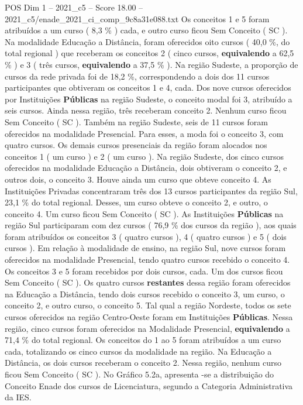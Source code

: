 \begin{textsample}{POS Dim 1 – 2021\_c5 – Score 18.00 – 2021\_c5/enade\_2021\_ci\_comp\_9c8a31e088.txt}
Os conceitos 1 e 5 foram atribuídos a um curso ( 8,3 \% ) cada, e outro curso ficou Sem Conceito ( SC ).
Na modalidade Educação a Distância, foram oferecidos oito cursos ( 40,0 \%, do total regional ) que receberam os conceitos 2 ( cinco cursos, \textbf{equivalendo} a 62,5 \% ) e 3 ( três cursos, \textbf{equivalendo} a 37,5 \% ).
Na região Sudeste, a proporção de cursos da rede privada foi de 18,2 \%, correspondendo a dois dos 11 cursos participantes que obtiveram os conceitos 1 e 4, cada.
Dos nove cursos oferecidos por Instituições \textbf{Públicas} na região Sudeste, o conceito modal foi 3, atribuído a seis cursos.
Ainda nessa região, três receberam conceito 2.
Nenhum curso ficou Sem Conceito ( SC ).
Também na região Sudeste, seis de 11 cursos foram oferecidos na modalidade Presencial.
Para esses, a moda foi o conceito 3, com quatro cursos.
Os demais cursos presenciais da região foram alocados nos conceitos 1 ( um curso ) e 2 ( um curso ).
Na região Sudeste, dos cinco cursos oferecidos na modalidade Educação a Distância, dois obtiveram o conceito 2, e outros dois, o conceito 3.
Houve ainda um curso que obteve conceito 4.
As Instituições Privadas concentraram três dos 13 cursos participantes da região Sul, 23,1 \% do total regional.
Desses, um curso obteve o conceito 2, e outro, o conceito 4.
Um curso ficou Sem Conceito ( SC ).
As Instituições \textbf{Públicas} na região Sul participaram com dez cursos ( 76,9 \% dos cursos da região ), aos quais foram atribuídos os conceitos 3 ( quatro cursos ), 4 ( quatro cursos ) e 5 ( dois cursos ).
Em relação à modalidade de ensino, na região Sul, nove cursos foram oferecidos na modalidade Presencial, tendo quatro cursos recebido o conceito 4.
Os conceitos 3 e 5 foram recebidos por dois cursos, cada.
Um dos cursos ficou Sem Conceito ( SC ).
Os quatro cursos \textbf{restantes} dessa região foram oferecidos na Educação a Distância, tendo dois cursos recebido o conceito 3, um curso, o conceito 2, e outro curso, o conceito 5.
Tal qual a região Nordeste, todos os sete cursos oferecidos na região Centro-Oeste foram em Instituições \textbf{Públicas}.
Nessa região, cinco cursos foram oferecidos na Modalidade Presencial, \textbf{equivalendo} a 71,4 \% do total regional.
Os conceitos do 1 ao 5 foram atribuídos a um curso cada, totalizando os cinco cursos da modalidade na região.
Na Educação a Distância, os dois cursos receberam o conceito 2.
Nessa região, nenhum curso ficou Sem Conceito ( SC ).
No Gráfico 5.2a, apresenta -se a distribuição do Conceito Enade dos cursos de Licenciatura, segundo a Categoria Administrativa da IES.

\end{textsample}
